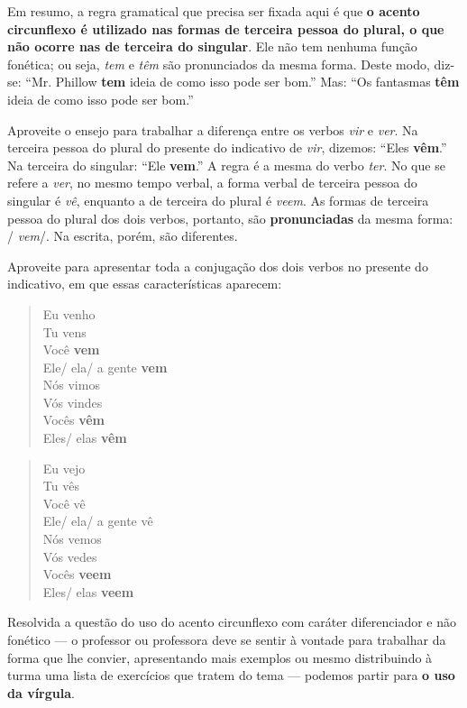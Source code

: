 \documentclass[11pt]{extarticle}
\begin{document}
Em resumo, a regra gramatical que precisa ser fixada aqui é que
\textbf{o acento circunflexo é utilizado nas formas de terceira pessoa do plural, o que não ocorre nas de terceira do singular}. Ele
não tem nenhuma função fonética; ou seja, \textit{tem} e \textit{têm}
são pronunciados da mesma forma.
Deste modo, diz-se: ``Mr. Phillow \textbf{tem} ideia de como isso pode ser bom.''
Mas: ``Os fantasmas \textbf{têm} ideia de como isso pode ser bom.''

Aproveite o ensejo para trabalhar a diferença entre os verbos \textit{vir}
e \textit{ver}. 
Na terceira pessoa do plural do presente do indicativo de \textit{vir}, dizemos: ``Eles \textbf{vêm}.''
Na terceira do singular: ``Ele \textbf{vem}.'' A regra é a mesma do verbo \textit{ter}. No que se refere a \textit{ver}, no mesmo tempo verbal, a forma verbal de terceira pessoa do singular é \textit{vê}, enquanto a de terceira do plural é \textit{veem}. As formas de terceira pessoa do plural dos dois verbos, portanto,
são \textbf{pronunciadas} da mesma forma: / \textit{vem}/. Na escrita, porém, são diferentes.

Aproveite para apresentar toda a conjugação dos dois verbos no presente do indicativo,
em que essas características aparecem:

\begin{verse}
Eu venho\\
Tu vens\\
Você \textbf{vem}\\
Ele/ ela/ a gente \textbf{vem}\\
Nós vimos\\
Vós vindes\\
Vocês \textbf{vêm}\\
Eles/ elas \textbf{vêm}\\
\end{verse}

\begin{verse}
Eu vejo\\
Tu vês\\
Você vê\\
Ele/ ela/ a gente vê\\
Nós vemos\\
Vós vedes\\
Vocês \textbf{veem}\\
Eles/ elas \textbf{veem}\\
\end{verse}

Resolvida a questão do uso do acento circunflexo com caráter diferenciador e não fonético
--- o professor ou professora deve se sentir à vontade para trabalhar da forma que lhe convier,
apresentando mais exemplos ou mesmo distribuindo à turma uma lista de exercícios que tratem do tema ---
podemos partir para \textbf{o uso da vírgula}.
\end{document}
